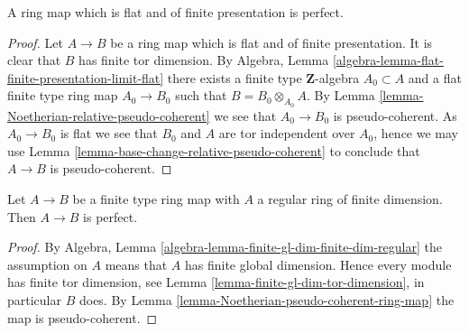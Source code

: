 \begin{lemma}
\label{lemma-flat-finite-presentation-perfect}
A ring map which is flat and of finite presentation is perfect.
\end{lemma}

\begin{proof}
Let $A \to B$ be a ring map which is flat and of finite presentation.
It is clear that $B$ has finite tor dimension. By
Algebra, Lemma \ref{algebra-lemma-flat-finite-presentation-limit-flat}
there exists a finite type $\mathbf{Z}$-algebra $A_0 \subset A$
and a flat finite type ring map $A_0 \to B_0$ such that
$B = B_0 \otimes_{A_0} A$. By
Lemma \ref{lemma-Noetherian-relative-pseudo-coherent}
we see that $A_0 \to B_0$ is pseudo-coherent.
As $A_0 \to B_0$ is flat we see that $B_0$ and $A$ are tor independent
over $A_0$, hence we may use
Lemma \ref{lemma-base-change-relative-pseudo-coherent}
to conclude that $A \to B$ is pseudo-coherent.
\end{proof}

\begin{lemma}
\label{lemma-regular-perfect-ring-map}
Let $A \to B$ be a finite type ring map with $A$ a regular ring
of finite dimension. Then $A \to B$ is perfect.
\end{lemma}

\begin{proof}
By
Algebra, Lemma \ref{algebra-lemma-finite-gl-dim-finite-dim-regular}
the assumption on $A$ means that $A$ has finite global dimension.
Hence every module has finite tor dimension, see
Lemma \ref{lemma-finite-gl-dim-tor-dimension},
in particular $B$ does. By
Lemma \ref{lemma-Noetherian-pseudo-coherent-ring-map}
the map is pseudo-coherent.
\end{proof}
















